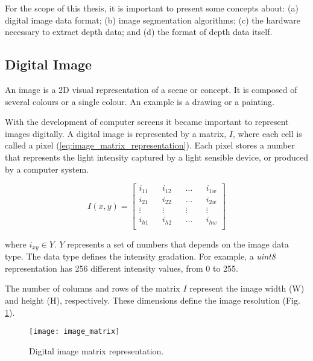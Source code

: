 For the scope of this thesis, it is important to present some concepts about: (a) digital image data format; (b) image segmentation algorithms; (c) the hardware necessary to extract depth data; and (d) the format of depth data itself.

\subsection{Digital Image}
\label{subsec:digital_image}

An image is a 2D visual representation of a scene or concept. It is composed of several colours or a single colour. An example is a drawing or a painting.

With the development of computer screens it became important to represent images digitally. A digital image is represented by a matrix, $I$, where each cell is called a pixel (\ref{eq:image_matrix_representation}). Each pixel stores a number that represents the light intensity captured by a light sensible device, or produced by a computer system.

\begin{equation}
    \label{eq:image_matrix_representation}
    I(x, y) = \begin{bmatrix}
        i_{11} && i_{12} && {}\ldots{} && i_{1w} \\
        i_{21} && i_{22} && {}\ldots{} && i_{2w} \\
        \vdots && \vdots  && \vdots  && \vdots \\
        i_{h1} && i_{h2} && {}\ldots{} && i_{hw}\\
    \end{bmatrix}
\end{equation}

where $i_{xy} \in Y$. $Y$ represents a set of numbers that depends on the image data type. The data type defines the intensity gradation. For example, a \textit{uint8} representation has 256 different intensity values, from 0 to 255.

The number of columns and rows of the matrix $I$ represent the image width (W) and height (H), respectively. These dimensions define the image resolution (Fig. \ref{fig:image_matrix}).\\

\begin{figure}[htbp]
	\centering
	\texttt{[image: image\_matrix]}
	\caption[Digital image matrix representation.]{Digital image matrix representation.}
	\label{fig:image_matrix}
\end{figure}

